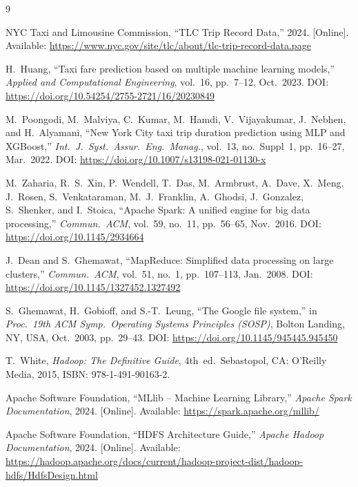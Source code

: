 \documentclass[conference]{IEEEtran}
\begin{document}
\begin{thebibliography}{9}

NYC Taxi and Limousine Commission,
``TLC Trip Record Data,''
2024. [Online].
Available: \url{https://www.nyc.gov/site/tlc/about/tlc-trip-record-data.page}

H.~Huang,
``Taxi fare prediction based on multiple machine learning models,''
\textit{Applied and Computational Engineering},
vol.~16, pp.~7--12, Oct.~2023.
DOI: \url{https://doi.org/10.54254/2755-2721/16/20230849}

M.~Poongodi, M.~Malviya, C.~Kumar, M.~Hamdi, V.~Vijayakumar,
J.~Nebhen, and H.~Alyamani,
``New York City taxi trip duration prediction using MLP and XGBoost,''
\textit{Int.\ J.\ Syst.\ Assur.\ Eng.\ Manag.},
vol.~13, no.~Suppl~1, pp.~16--27, Mar.~2022.
DOI: \url{https://doi.org/10.1007/s13198-021-01130-x}

M.~Zaharia, R.~S.~Xin, P.~Wendell, T.~Das, M.~Armbrust,
A.~Dave, X.~Meng, J.~Rosen, S.~Venkataraman, M.~J.~Franklin,
A.~Ghodsi, J.~Gonzalez, S.~Shenker, and I.~Stoica,
``Apache Spark: A unified engine for big data processing,''
\textit{Commun.\ ACM},
vol.~59, no.~11, pp.~56--65, Nov.~2016.
DOI: \url{https://doi.org/10.1145/2934664}

J.~Dean and S.~Ghemawat,
``MapReduce: Simplified data processing on large clusters,''
\textit{Commun.\ ACM},
vol.~51, no.~1, pp.~107--113, Jan.~2008.
DOI: \url{https://doi.org/10.1145/1327452.1327492}

S.~Ghemawat, H.~Gobioff, and S.-T.~Leung,
``The Google file system,''
in \textit{Proc.\ 19th ACM Symp.\ Operating Systems Principles (SOSP)},
Bolton Landing, NY, USA, Oct.~2003, pp.~29--43.
DOI: \url{https://doi.org/10.1145/945445.945450}

T.~White,
\textit{Hadoop: The Definitive Guide},
4th~ed.\
Sebastopol, CA: O'Reilly Media, 2015,
ISBN: 978-1-491-90163-2.

Apache Software Foundation,
``MLlib -- Machine Learning Library,''
\textit{Apache Spark Documentation}, 2024. [Online].
Available: \url{https://spark.apache.org/mllib/}

Apache Software Foundation,
``HDFS Architecture Guide,''
\textit{Apache Hadoop Documentation}, 2024. [Online].
Available: \url{https://hadoop.apache.org/docs/current/hadoop-project-dist/hadoop-hdfs/HdfsDesign.html}

\end{thebibliography}
\end{document}

